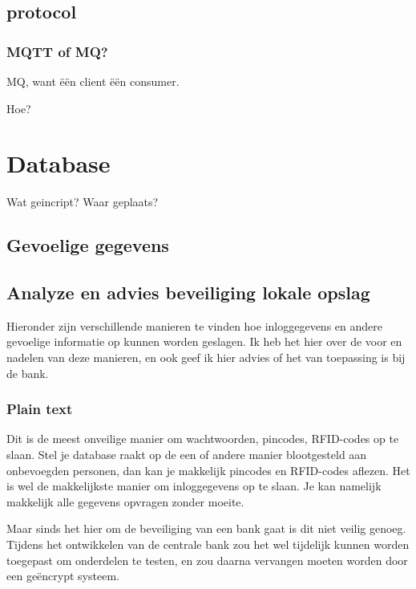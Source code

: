 \documentclass{article}
\begin{document}
\subsection{protocol}

\subsubsection{MQTT of MQ?}

MQ, want \"e\"en client \"e\"en consumer.

Hoe?

\section{Database}

Wat geincript?
Waar geplaats?

\newpage

\subsection{Gevoelige gegevens}

\subsection{Analyze en advies beveiliging lokale opslag} 

Hieronder zijn verschillende manieren te vinden hoe inloggegevens en andere gevoelige informatie op kunnen worden geslagen.
Ik heb het hier over de voor en nadelen van deze manieren, en ook geef ik hier advies of het van toepassing is bij de bank.

\subsubsection{Plain text}

Dit is de meest onveilige manier om wachtwoorden, pincodes, RFID-codes op te slaan.
Stel je database raakt op de een of andere manier blootgesteld aan onbevoegden personen, dan kan je makkelijk pincodes en RFID-codes aflezen. 
Het is wel de makkelijkste manier om inloggegevens op te slaan.
Je kan namelijk makkelijk alle gegevens opvragen zonder moeite.

Maar sinds het hier om de beveiliging van een bank gaat is dit niet veilig genoeg.
Tijdens het ontwikkelen van de centrale bank zou het wel tijdelijk kunnen worden toegepast om onderdelen te testen, en zou daarna vervangen moeten worden door een ge\"encrypt systeem.
\end{document}
